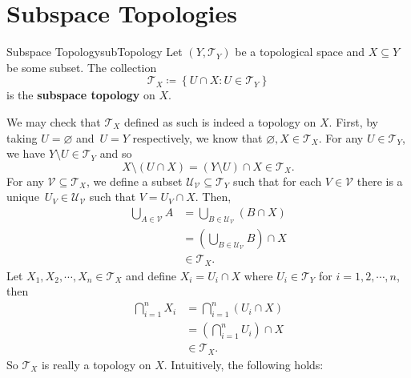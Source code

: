 \documentclass[math]{amznotes}
\theoremstyle{remark}
\begin{document}
\section{Subspace Topologies}
\begin{dfnbox}{Subspace Topology}{subTopology}
    Let $\left(Y, \mathcal{T}_Y\right)$ be a topological space and $X \subseteq Y$ be some subset. The collection
    \begin{equation*}
        \mathcal{T}_X \coloneqq \left\{U \cap X \colon U \in \mathcal{T}_Y\right\}
    \end{equation*}
    is the {\color{red} \textbf{subspace topology}} on $X$.
\end{dfnbox}
We may check that $\mathcal{T}_X$ defined as such is indeed a topology on $X$. First, by taking $U = \varnothing$ and~$U = Y$ respectively, we know that $\varnothing, X \in \mathcal{T}_X$. For any $U \in \mathcal{T}_Y$, we have $Y \setminus U \in \mathcal{T}_Y$ and so 
\begin{equation*}
    X \setminus \left(U \cap X\right) = \left(Y \setminus U\right) \cap X \in \mathcal{T}_X.
\end{equation*}
For any $\mathcal{V} \subseteq \mathcal{T}_X$, we define a subset $\mathcal{U_{\mathcal{V}}} \subseteq \mathcal{T}_Y$ such that for each $V \in \mathcal{V}$ there is a unique~$U_V \in \mathcal{U}_{\mathcal{V}}$ such that $V = U_V \cap X$. Then, 
\begin{align*}
    \bigcup_{A \in \mathcal{V}}A & = \bigcup_{B \in \mathcal{U}_{\mathcal{V}}}\left(B \cap X\right) \\
    & = \left(\bigcup_{B \in \mathcal{U}_{\mathcal{V}}}B\right) \cap X \\
    & \in \mathcal{T}_X.
\end{align*}
Let $X_1, X_2, \cdots, X_n \in \mathcal{T}_X$ and define $X_i = U_i \cap X$ where $U_i \in \mathcal{T}_Y$ for $i = 1, 2, \cdots, n$, then 
\begin{align*}
    \bigcap_{i = 1}^nX_i & = \bigcap_{i = 1}^n\left(U_i \cap X\right) \\
    & = \left(\bigcap_{i = 1}^nU_i\right) \cap X \\
    & \in \mathcal{T}_X.
\end{align*}
So $\mathcal{T}_X$ is really a topology on $X$. Intuitively, the following holds:
\end{document}
